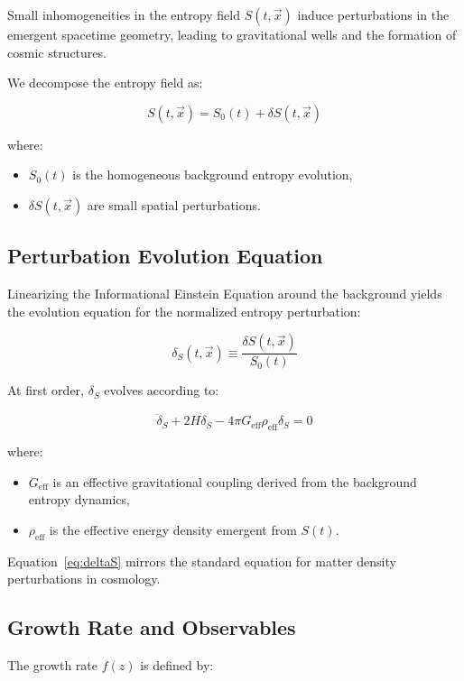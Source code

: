 \documentclass{article}
\begin{document}
Small inhomogeneities in the entropy field $S(t, \vec{x})$ induce perturbations in the emergent spacetime geometry, leading to gravitational wells and the formation of cosmic structures.

We decompose the entropy field as:

\begin{equation}
S(t, \vec{x}) = S_0(t) + \delta S(t, \vec{x})
\end{equation}

where:
\begin{itemize}
    \item $S_0(t)$ is the homogeneous background entropy evolution,
    \item $\delta S(t, \vec{x})$ are small spatial perturbations.
\end{itemize}

\subsection{Perturbation Evolution Equation}

Linearizing the Informational Einstein Equation around the background yields the evolution equation for the normalized entropy perturbation:

\[
\delta_S(t, \vec{x}) \equiv \frac{\delta S(t, \vec{x})}{S_0(t)}
\]

At first order, $\delta_S$ evolves according to:

\begin{equation}
\ddot{\delta}_S + 2H \dot{\delta}_S - 4\pi G_{\text{eff}} \rho_{\text{eff}} \delta_S = 0
\label{eq:deltaS}
\end{equation}

where:
\begin{itemize}
    \item $G_{\text{eff}}$ is an effective gravitational coupling derived from the background entropy dynamics,
    \item $\rho_{\text{eff}}$ is the effective energy density emergent from $S(t)$.
\end{itemize}

Equation~\eqref{eq:deltaS} mirrors the standard equation for matter density perturbations in cosmology.

\subsection{Growth Rate and Observables}

The growth rate $f(z)$ is defined by:
\end{document}
